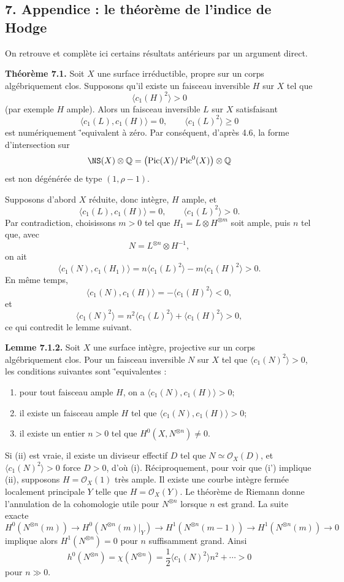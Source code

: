\documentclass[11pt]{article}
\providecommand{\Pic}{\operatorname{Pic}}
\providecommand{\Q}{\mathbb Q}
\begin{document}
\subsection*{7. Appendice : le th\'eor\`eme de l'indice de Hodge}

On retrouve et compl\`ete ici certains r\'esultats ant\'erieurs par un argument direct.

\textbf{Th\'eor\`eme 7.1.} Soit $X$ une surface irr\'eductible, propre sur un corps alg\'ebriquement clos. Supposons qu'il existe un faisceau inversible $H$ sur $X$ tel que
\[
   \langle c_1(H)^2\rangle>0
\]
(par exemple $H$ ample). Alors un faisceau inversible $L$ sur $X$ satisfaisant
\[
   \langle c_1(L),c_1(H)\rangle=0,
   \qquad
   \langle c_1(L)^2\rangle\ge0
\]
est num\'eriquement \='equivalent \`a z\'ero. Par cons\'equent, d'apr\`es 4.6, la forme d'intersection sur
\[
   \NS(X)\otimes\Q=\bigl(\Pic(X)/\Pic^0(X)\bigr)\otimes\Q
\]
est non d\'eg\'en\'er\'ee de type $(1,\rho-1)$.

Supposons d'abord $X$ r\'eduite, donc int\`egre, $H$ ample, et
\[
   \langle c_1(L),c_1(H)\rangle=0,
   \qquad
   \langle c_1(L)^2\rangle>0.
\]
Par contradiction, choisissons $m>0$ tel que $H_1=L\otimes H^{\otimes m}$ soit ample, puis $n$ tel que, avec
\[
   N=L^{\otimes n}\otimes H^{-1},
\]
on ait
\[
   \langle c_1(N),c_1(H_1)\rangle
   =n\langle c_1(L)^2\rangle-m\langle c_1(H)^2\rangle>0.
\]
En m\^eme temps,
\[
   \langle c_1(N),c_1(H)\rangle=-\langle c_1(H)^2\rangle<0,
\]
et
\[
   \langle c_1(N)^2\rangle=n^2\langle c_1(L)^2\rangle+\langle c_1(H)^2\rangle>0,
\]
ce qui contredit le lemme suivant.

\textbf{Lemme 7.1.2.} Soit $X$ une surface int\`egre, projective sur un corps alg\'ebriquement clos. Pour un faisceau inversible $N$ sur $X$ tel que $\langle c_1(N)^2\rangle>0$, les conditions suivantes sont \='equivalentes :
\begin{enumerate}[label=\roman*)]
\item pour tout faisceau ample $H$, on a $\langle c_1(N),c_1(H)\rangle>0$;
\item[(i')] il existe un faisceau ample $H$ tel que $\langle c_1(N),c_1(H)\rangle>0$;
\item il existe un entier $n>0$ tel que $H^0(X,N^{\otimes n})\ne0$.
\end{enumerate}
Si (ii) est vraie, il existe un diviseur effectif $D$ tel que $N\simeq\mathcal O_X(D)$, et $\langle c_1(N)^2\rangle>0$ force $D>0$, d'o\`u (i). R\'eciproquement, pour voir que (i') implique (ii), supposons $H=\mathcal O_X(1)$ tr\`es ample. Il existe une courbe int\`egre ferm\'ee localement principale $Y$ telle que $H=\mathcal O_X(Y)$. Le th\'eor\`eme de Riemann donne l'annulation de la cohomologie utile pour $N^{\otimes n}$ lorsque $n$ est grand. La suite exacte
\[
 H^0(N^{\otimes n}(m))\to H^0(N^{\otimes n}(m)|_Y)\to
 H^1(N^{\otimes n}(m-1))\to H^1(N^{\otimes n}(m))\to0
\]
implique alors $H^1(N^{\otimes n})=0$ pour $n$ suffisamment grand. Ainsi
\[
   h^0(N^{\otimes n})=\chi(N^{\otimes n})=\frac12\langle c_1(N)^2\rangle n^2+\cdots>0
\]
pour $n\gg0$.
\end{document}
